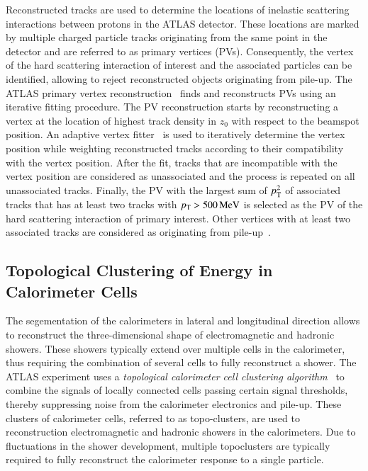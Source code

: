 Reconstructed tracks are used to determine the locations of inelastic scattering
interactions between protons in the ATLAS detector. These locations are marked
by multiple charged particle tracks originating from the same point in the
detector and are referred to as primary vertices (PVs). Consequently, the vertex
of the hard scattering interaction of interest and the associated particles can
be identified, allowing to reject reconstructed objects originating from
pile-up. The ATLAS primary vertex reconstruction~\cite{PERF-2015-01} finds and
reconstructs PVs using an iterative fitting procedure. The PV reconstruction
starts by reconstructing a vertex at the location of highest track density in
$z_0$ with respect to the beamspot position. An adaptive vertex
fitter~\cite{Fruhwirth:2007hz} is used to iteratively determine the vertex
position while weighting reconstructed tracks according to their compatibility
with the vertex position. After the fit, tracks that are incompatible with the
vertex position are considered as unassociated and the process is repeated on
all unassociated tracks. Finally, the PV with the largest sum of $p_{\text{T}}^2$ of
associated tracks that has at least two tracks with $p_{\text{T}} > \SI{500}{\ensuremath{\text{MeV}}}$ is
selected as the PV of the hard scattering interaction of primary interest. Other
vertices with at least two associated tracks are considered as originating from
pile-up~\cite{PERF-2015-01}.


\subsection{Topological Clustering of Energy in Calorimeter Cells}

The segementation of the calorimeters in lateral and longitudinal direction
allows to reconstruct the three-dimensional shape of electromagnetic and
hadronic showers. These showers typically extend over multiple cells in the
calorimeter, thus requiring the combination of several cells to fully
reconstruct a shower. The ATLAS experiment uses a \emph{topological calorimeter
  cell clustering algorithm}~\cite{PERF-2014-07} to combine the signals of
locally connected cells passing certain signal thresholds, thereby suppressing
noise from the calorimeter electronics and pile-up. These clusters of
calorimeter cells, referred to as topo-clusters, are used to reconstruction
electromagnetic and hadronic showers in the calorimeters. Due to fluctuations in
the shower development, multiple topoclusters are typically required to fully
reconstruct the calorimeter response to a single particle.

